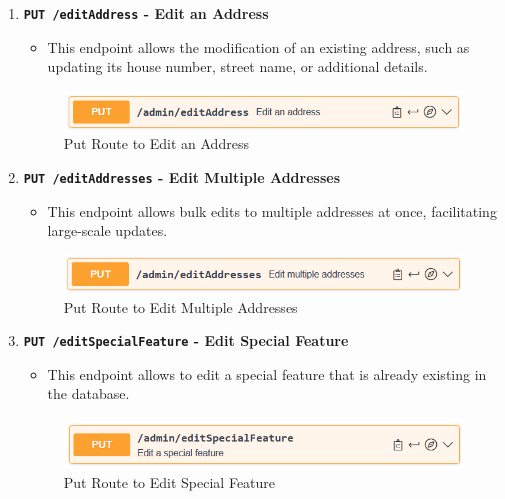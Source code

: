 \begin{enumerate}
        \item \textbf{\texttt{PUT /editAddress} - Edit an Address}
        \begin{itemize}
            \item This endpoint allows the modification of an existing address, such as updating its house number, street name, or additional details.
        \end{itemize} 
        \begin{figure} [H]
            \centering
            \includegraphics [width=1\textwidth] {images/andreas/praxis/editAddress.png}
            \caption{Put Route to Edit an Address}
        \end{figure}

        \item \textbf{\texttt{PUT /editAddresses} - Edit Multiple Addresses}
        \begin{itemize}
            \item This endpoint allows bulk edits to multiple addresses at once, facilitating large-scale updates.
        \end{itemize} 
        \begin{figure} [H]
            \centering
            \includegraphics [width=1\textwidth] {images/andreas/praxis/editAddresses.png}
            \caption{Put Route to Edit Multiple Addresses}
        \end{figure}

        \item \textbf{\texttt{PUT /editSpecialFeature} - Edit Special Feature}
        \begin{itemize}
            \item This endpoint allows to edit a special feature that is already existing in the database.
        \end{itemize} 
        \begin{figure} [H]
            \centering
            \includegraphics [width=1\textwidth] {images/andreas/praxis/editSF.png}
            \caption{Put Route to Edit Special Feature}
        \end{figure}
    \end{enumerate}

